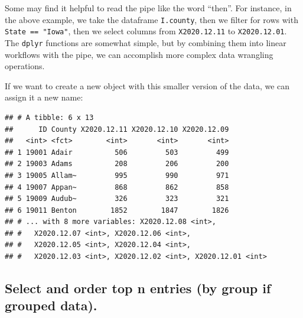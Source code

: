 \documentclass[]{book}
\newenvironment{Shaded}{\begin{snugshade}}{\end{snugshade}}
\newcommand{\KeywordTok}[1]{\textcolor[rgb]{0.13,0.29,0.53}{\textbf{#1}}}
\newcommand{\FloatTok}[1]{\textcolor[rgb]{0.00,0.00,0.81}{#1}}
\newcommand{\StringTok}[1]{\textcolor[rgb]{0.31,0.60,0.02}{#1}}
\newcommand{\CommentTok}[1]{\textcolor[rgb]{0.56,0.35,0.01}{\textit{#1}}}
\newcommand{\OperatorTok}[1]{\textcolor[rgb]{0.81,0.36,0.00}{\textbf{#1}}}
\newcommand{\NormalTok}[1]{#1}
\begin{document}
Some may find it helpful to read the pipe like the word ``then''. For
instance, in the above example, we take the dataframe \texttt{I.county},
then we filter for rows with \texttt{State\ ==\ "Iowa"}, then we select
columns from \texttt{X2020.12.11} to \texttt{X2020.12.01}. The
\texttt{dplyr} functions are somewhat simple, but by combining them into
linear workflows with the pipe, we can accomplish more complex data
wrangling operations.

If we want to create a new object with this smaller version of the data,
we can assign it a new name:

\begin{Shaded}
\end{Shaded}

\begin{verbatim}
## # A tibble: 6 x 13
##      ID County X2020.12.11 X2020.12.10 X2020.12.09
##   <int> <fct>        <int>       <int>       <int>
## 1 19001 Adair          506         503         499
## 2 19003 Adams          208         206         200
## 3 19005 Allam~         995         990         971
## 4 19007 Appan~         868         862         858
## 5 19009 Audub~         326         323         321
## 6 19011 Benton        1852        1847        1826
## # ... with 8 more variables: X2020.12.08 <int>,
## #   X2020.12.07 <int>, X2020.12.06 <int>,
## #   X2020.12.05 <int>, X2020.12.04 <int>,
## #   X2020.12.03 <int>, X2020.12.02 <int>, X2020.12.01 <int>
\end{verbatim}

\subsection{Select and order top n entries (by group if grouped
data).}\label{select-and-order-top-n-entries-by-group-if-grouped-data.}
\end{document}

